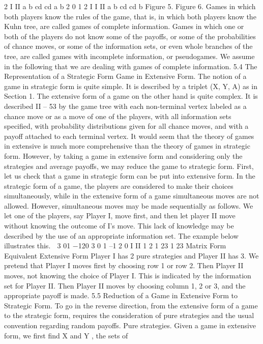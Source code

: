 2
I
II
a b
cd cd
a b
2 0
1
2
I
I
II
a b
cd cd
b
Figure 5. Figure 6.
Games in which both players know the rules of the game, that is, in which both players
know the Kuhn tree, are called games of complete information. Games in which one or
both of the players do not know some of the payoffs, or some of the probabilities of chance
moves, or some of the information sets, or even whole branches of the tree, are called
games with incomplete information, or pseudogames. We assume in the following
that we are dealing with games of complete information.
5.4 The Representation of a Strategic Form Game in Extensive Form. The
notion of a game in strategic form is quite simple. It is described by a triplet (X, Y, A) as in
Section 1. The extensive form of a game on the other hand is quite complex. It is described
II – 53
by the game tree with each non-terminal vertex labeled as a chance move or as a move
of one of the players, with all information sets specified, with probability distributions
given for all chance moves, and with a payoff attached to each terminal vertex. It would
seem that the theory of games in extensive is much more comprehensive than the theory
of games in strategic form. However, by taking a game in extensive form and considering
only the strategies and average payoffs, we may reduce the game to strategic form.
First, let us check that a game in strategic form can be put into extensive form. In the
strategic form of a game, the players are considered to make their choices simultaneously,
while in the extensive form of a game simultaneous moves are not allowed. However,
simultaneous moves may be made sequentially as follows. We let one of the players, say
Player I, move first, and then let player II move without knowing the outcome of I’s move.
This lack of knowledge may be described by the use of an appropriate information set.
The example below illustrates this.
 3 01
−120
3 0 1 –1 2 0
I
II
1 2
1 23 1 23
Matrix Form Equivalent Extensive Form
Player I has 2 pure strategies and Player II has 3. We pretend that Player I moves first by
choosing row 1 or row 2. Then Player II moves, not knowing the choice of Player I. This is
indicated by the information set for Player II. Then Player II moves by choosing column
1, 2 or 3, and the appropriate payoff is made.
5.5 Reduction of a Game in Extensive Form to Strategic Form. To go in
the reverse direction, from the extensive form of a game to the strategic form, requires the
consideration of pure strategies and the usual convention regarding random payoffs.
Pure strategies. Given a game in extensive form, we first find X and Y , the sets of
